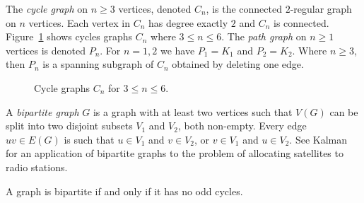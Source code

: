 The \emph{cycle graph} on $n \geq 3$ vertices,
denoted $C_n$, is the connected $2$-regular graph on $n$
vertices. Each vertex in $C_n$ has degree exactly $2$ and $C_n$ is
connected. Figure~\ref{fig:introduction:four_cycle_graphs} shows
cycles graphs $C_n$ where $3 \leq n \leq 6$. The
\emph{path graph} on $n \geq 1$ vertices is denoted
$P_n$. For $n = 1, 2$ we have $P_1 = K_1$ and
$P_2 = K_2$. Where $n \geq 3$, then $P_n$ is a spanning subgraph of
$C_n$ obtained by deleting one edge.

\begin{figure}[!htbp]
\centering
{}

\caption{Cycle graphs $C_n$ for $3 \leq n \leq 6$.}
\label{fig:introduction:four_cycle_graphs}
\end{figure}

A \emph{bipartite graph} $G$ is a graph with at
least two vertices such that $V(G)$ can be split into two disjoint
subsets $V_1$ and $V_2$, both non-empty. Every edge $uv \in E(G)$ is
such that $u \in V_1$ and $v \in V_2$, or $v \in V_1$ and $u \in V_2$.
See Kalman~\cite{Kalman1999} for an application of bipartite graphs to
the problem of allocating satellites to radio stations.

\begin{theorem}
A graph is bipartite if and only if it has no odd cycles.
\end{theorem}

